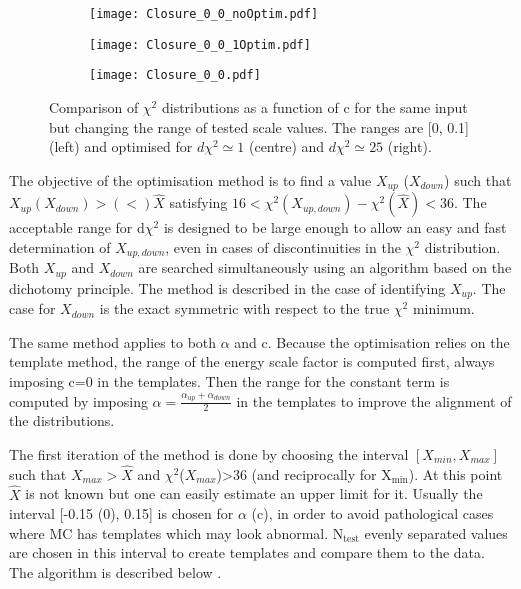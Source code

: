 \begin{figure}
\begin{subfigure}[t]{0.32\linewidth}
\begin{center}
\texttt{[image: Closure\_0\_0\_noOptim.pdf]}
\end{center}
\end{subfigure}
\begin{subfigure}[t]{0.32\linewidth}
\begin{center}
\texttt{[image: Closure\_0\_0\_1Optim.pdf]}
\end{center}
\end{subfigure}
\begin{subfigure}[t]{0.32\linewidth}
\begin{center}
\texttt{[image: Closure\_0\_0.pdf]}
\end{center}
\end{subfigure}
\caption{\label{org010bed5}
    Comparison of $\chi^2$ distributions as a function of c for the same input but changing the range of tested scale values. The ranges are [0, 0.1] (left) and optimised for $d\chi^2 \simeq 1$ (centre) and $d\chi^2 \simeq 25$ (right).}
\end{figure}


The objective of the optimisation method is to find a value $X_{up}$ ($X_{down}$) such that $X_{up} (X_{down}) > (<) \hat{X}$ satisfying $16<\chi^2(X_{up,down})-\chi^2(\hat{X})<36$.
The acceptable range for d$\chi^2$ is designed to be large enough to allow an easy and fast determination of $X_{up,down}$, even in cases of discontinuities in the $\chi^2$ distribution.
Both $X_{up}$ and $X_{down}$ are searched simultaneously using an algorithm based on the dichotomy principle.
The method is described in the case of identifying $X_{up}$.
The case for $X_{down}$ is the exact symmetric with respect to the true $\chi^2$ minimum.

The same method applies to both $\alpha$ and c.
Because the optimisation relies on the template method, the range of the energy scale factor is computed first, always imposing c=0 in the templates.
Then the range for the constant term is computed by imposing \(\alpha=\frac{\alpha_{up}+\alpha_{down}}{2}\) in the templates to improve the alignment of the distributions.

The first iteration of the method is done by choosing the interval $[X_{min}, X_{max}]$ such that \(X_{max}>\hat{X}\) and $\chi^2$($X_{max}$)>36 (and reciprocally for X\(_{\text{min}}\)).
At this point \(\hat{X}\) is not known but one can easily estimate an upper limit for it.
Usually the interval [-0.15 (0), 0.15] is chosen for $\alpha$ (c), in order to avoid pathological cases where MC has templates which may look abnormal.
N\(_{\text{test}}\) evenly separated values are chosen in this interval to create templates and compare them to the data.
The algorithm is described below .

